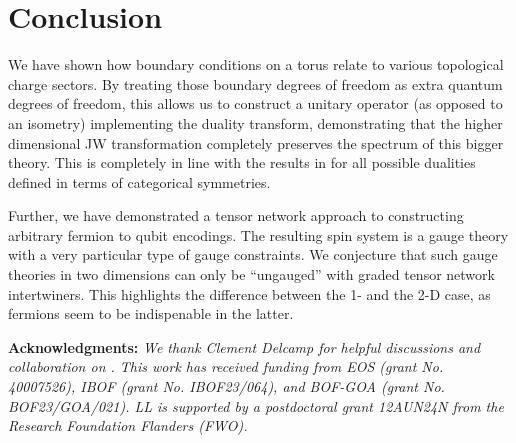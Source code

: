 \documentclass[aps,prx,twocolumn,floatfix,10pt,amssymb,amsfont,amsmath,superscriptaddress,float,nofootinbib,longbibliography,nobalancelastpage]{revtex4-2}
\begin{document}
\section{Conclusion}
We have shown how boundary conditions on a torus relate to various topological charge sectors. By treating those boundary degrees of freedom as extra quantum degrees of freedom, this allows us to construct a unitary operator (as opposed to an isometry) 
implementing the duality transform, demonstrating that the higher dimensional JW transformation completely preserves the spectrum of this bigger theory. This is completely in line with the results in \cite{lootens2023lowdepth, Lootens_2023, Lootens:2022avn} for all possible dualities defined in terms of categorical symmetries. 

Further, we have demonstrated a tensor network approach to constructing arbitrary fermion to qubit encodings. The resulting spin system is a gauge theory with a very particular type of gauge constraints. We conjecture that such gauge theories in two dimensions can only be ``ungauged''  with graded tensor network intertwiners. This highlights the difference between the 1- and the 2-D case, as fermions seem to be indispenable in the latter. 



\medskip\noindent
\textbf{Acknowledgments:} \emph{We thank Clement Delcamp for helpful discussions and collaboration on \cite{lootens2023lowdepth,Lootens_2023, Lootens:2022avn}. This work has received funding from EOS (grant No. 40007526), IBOF (grant No. IBOF23/064), and BOF-GOA (grant No. BOF23/GOA/021). LL is supported by a postdoctoral grant 12AUN24N from the Research Foundation Flanders (FWO).}

\newpage


\end{document}
